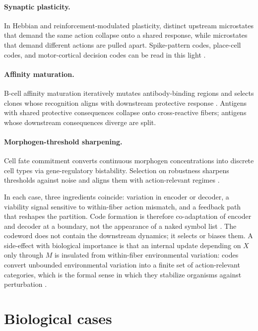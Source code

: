 \documentclass[12pt]{article}
\theoremstyle{definition}
\begin{document}
\paragraph{Synaptic plasticity.} In Hebbian and reinforcement-modulated plasticity, distinct upstream microstates that demand the same action collapse onto a shared response, while microstates that demand different actions are pulled apart. Spike-pattern codes, place-cell codes, and motor-cortical decision codes can be read in this light \citep{buzsaki2004,fries2015,panzeri2010}.

\paragraph{Affinity maturation.} B-cell affinity maturation iteratively mutates antibody-binding regions and selects clones whose recognition aligns with downstream protective response \citep{janeway2001,davis1998}. Antigens with shared protective consequences collapse onto cross-reactive fibers; antigens whose downstream consequences diverge are split.

\paragraph{Morphogen-threshold sharpening.} Cell fate commitment converts continuous morphogen concentrations into discrete cell types via gene-regulatory bistability. Selection on robustness sharpens thresholds against noise and aligns them with action-relevant regimes \citep{pezzulo2016,levin2023,levin2025multiscale}.

In each case, three ingredients coincide: variation in encoder or decoder, a viability signal sensitive to within-fiber action mismatch, and a feedback path that reshapes the partition. Code formation is therefore co-adaptation of encoder and decoder at a boundary, not the appearance of a naked symbol list \citep{pattee2001,barbieri2003,barbieri2015}. The codeword does not contain the downstream dynamics; it selects or biases them. A side-effect with biological importance is that an internal update depending on $X$ only through $M$ is insulated from within-fiber environmental variation: codes convert unbounded environmental variation into a finite set of action-relevant categories, which is the formal sense in which they stabilize organisms against perturbation \citep{maturana1980}.

\section{Biological cases}
\label{sec:cases}
\end{document}

